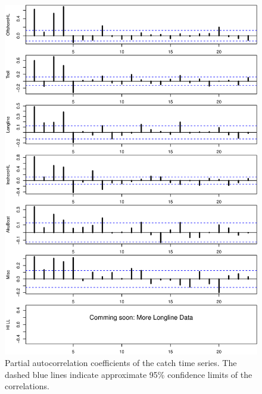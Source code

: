 \documentclass[12pt,letterpaper]{article}
\begin{document}
\begin{figure}
\begin{center}
\includegraphics[height=0.9\textheight]{./graphics/partial_acf.png}
\caption{\label{fig:catchPACF}
Partial autocorrelation coefficients of the catch time series. The
dashed blue lines indicate approximate 95\% confidence limits of the
correlations.}
\end{center}
\end{figure}
\end{document}
